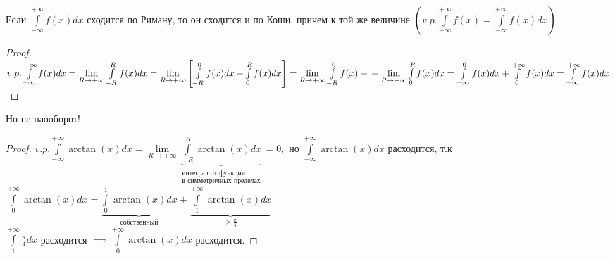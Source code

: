 \documentclass[../main.tex]{subfiles}
\begin{document}
\begin{theorem}
Если $\int\limits_{-\infty  }^{+\infty  } f(x)dx$ сходится по Риману, то он сходится и по Коши, причем к той же величине $\left(v.p. \int\limits_{-\infty   }^{+\infty}f(x)=\int\limits_{-\infty    }^{+\infty  } f(x)dx \right)$ 
\end{theorem}
\begin{proof}
$v.p. \int\limits_{-\infty  }^{+\infty}f(x)dx=\lim\limits_{R\to +\infty}\int\limits_{-R}^{R}f(x)dx=\lim\limits_{R\to +\infty}\left[\int\limits_{-R}^{0}f(x)dx +\int\limits_{0}^{R}f(x)dx\right]=\lim\limits_{R\to +\infty}\int\limits_{-R}^{0}f(x)+\\+\lim\limits_{R\to +\infty   } \int\limits_{0}^{R}f(x)dx= \int\limits_{-\infty    }^{0} f(x)dx+\int\limits_{0}^{+\infty   } f(x)dx= \int\limits_{-\infty  }^{+\infty  } f(x)dx  $
\end{proof}
Но не наооборот! 
\begin{proof}
$v.p. \int\limits_{-\infty  }^{+\infty  } \arctan{(x)}dx=\lim\limits_{R\to +\infty}\underbrace{\int\limits_{-R}^{R}\arctan{(x)}dx}_{\substack{\text{интеграл от функции}\\ \text{в симметричных пределах}}}  =0, \text{ но } \int\limits_{-\infty  }^{+\infty  } \arctan{(x)}dx$ расходится, т.к $\int\limits_{0}^{+\infty}\arctan{(x)}dx = \underbrace{\int\limits_{0}^{1}\arctan{(x)}dx}_{\text{собственный}} +\underbrace{\int\limits_{1}^{+\infty}\arctan{(x)}dx}_{\geqslant \frac{\pi}{4}} $
\\ $\int\limits_{1}^{+\infty}\frac{\pi}{4} dx  $ расходится $\implies \int\limits_{0}^{+\infty}\arctan{(x)}dx $ расходится.
\end{proof}
\end{document}
